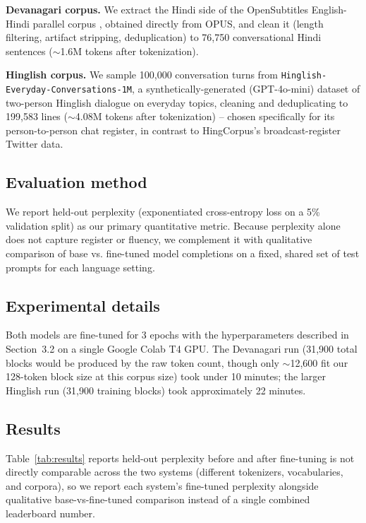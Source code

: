 \documentclass[11pt]{article}
\begin{document}
\textbf{Devanagari corpus.} We extract the Hindi side of the OpenSubtitles English-Hindi parallel corpus \citep{lison2016opensubtitles}, obtained directly from OPUS, and clean it (length filtering, artifact stripping, deduplication) to 76{,}750 conversational Hindi sentences ($\sim$1.6M tokens after tokenization).

\textbf{Hinglish corpus.} We sample 100{,}000 conversation turns from \texttt{Hinglish-Everyday-Conversations-1M}, a synthetically-generated (GPT-4o-mini) dataset of two-person Hinglish dialogue on everyday topics, cleaning and deduplicating to 199{,}583 lines ($\sim$4.08M tokens after tokenization) -- chosen specifically for its person-to-person chat register, in contrast to HingCorpus's broadcast-register Twitter data.

\subsection{Evaluation method}

We report held-out perplexity (exponentiated cross-entropy loss on a 5\% validation split) as our primary quantitative metric. Because perplexity alone does not capture register or fluency, we complement it with qualitative comparison of base vs. fine-tuned model completions on a fixed, shared set of test prompts for each language setting.

\subsection{Experimental details}

Both models are fine-tuned for 3 epochs with the hyperparameters described in Section~3.2 on a single Google Colab T4 GPU. The Devanagari run (31{,}900 total blocks would be produced by the raw token count, though only $\sim$12{,}600 fit our 128-token block size at this corpus size) took under 10 minutes; the larger Hinglish run (31{,}900 training blocks) took approximately 22 minutes.

\subsection{Results}

Table~\ref{tab:results} reports held-out perplexity before and after fine-tuning is not directly comparable across the two systems (different tokenizers, vocabularies, and corpora), so we report each system's fine-tuned perplexity alongside qualitative base-vs-fine-tuned comparison instead of a single combined leaderboard number.
\end{document}
